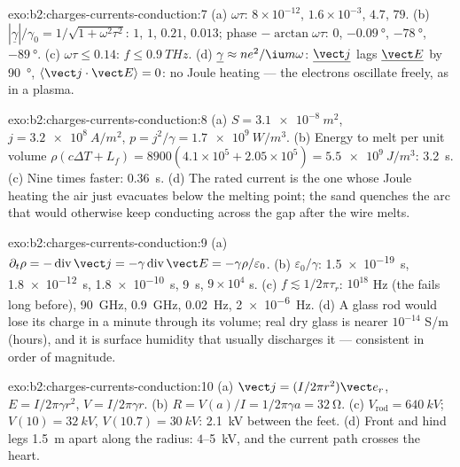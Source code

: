 \begin{solution}{exo:b2:charges-currents-conduction:7}
(a) $\omega\tau$: $8 \times 10^{-12}$, $1.6 \times 10^{-3}$, $4.7$, $79$. (b) $|\underline\gamma|/\gamma_0 =
1/\sqrt{1 + \omega^2\tau^2}$: $1$, $1$, $0.21$, $0.013$; phase $-\arctan\omega\tau$: $0$,
$-\qty{0.09}{\degree}$, $-\qty{78}{\degree}$, $-\qty{89}{\degree}$. (c) $\omega\tau \le 0.14$: $f \le
\qty{0.9}{THz}$. (d) $\underline\gamma \approx ne^2/\iu m\omega$: $\underline{\vect j}$ lags
$\underline{\vect E}$ by \qty{90}{\degree}, $\langle\vect j\cdot\vect E\rangle = 0$: no Joule
heating --- the electrons oscillate freely, as in a plasma.
\end{solution}

\begin{solution}{exo:b2:charges-currents-conduction:8}
(a) $S = \qty{3.1e-8}{m^2}$, $j = \qty{3.2e8}{A/m^2}$, $p = j^2/\gamma = \qty{1.7e9}{W/m^3}$.
(b) Energy to melt per unit volume $\rho(c\Delta T + L_f) = 8900(4.1 \times 10^5 + 2.05 \times
10^5) = \qty{5.5e9}{J/m^3}$: \qty{3.2}{s}. (c) Nine times faster: \qty{0.36}{s}. (d) The
rated current is the one whose Joule heating the air just evacuates
below the melting point; the sand quenches the arc that would
otherwise keep conducting across the gap after the wire melts.
\end{solution}

\begin{solution}{exo:b2:charges-currents-conduction:9}
(a) $\partial_t\rho = -\operatorname{div}\vect j = -\gamma\operatorname{div}\vect E = -\gamma\rho/
\varepsilon_0$. (b) $\varepsilon_0/\gamma$: \qty{1.5e-19}{s}, \qty{1.8e-12}{s}, \qty{1.8e-10}{s},
\qty{9}{s}, $9 \times 10^4$ s. (c) $f \lesssim 1/2\pi\tau_r$: $10^{18}$ Hz (the 
fails long before), \qty{90}{GHz}, \qty{0.9}{GHz}, \qty{0.02}{Hz}, \qty{2e-6}{Hz}. (d)
A glass rod would lose its charge in a minute through its volume;
real dry glass is nearer $10^{-14}$ S/m (hours), and it is surface
humidity that usually discharges it --- consistent in order of
magnitude.
\end{solution}

\begin{solution}{exo:b2:charges-currents-conduction:10}
(a) $\vect j = (I/2\pi r^2)\vect e_r$, $E = I/2\pi\gamma r^2$, $V = I/2\pi\gamma r$. (b) $R = V(a)
/I = 1/2\pi\gamma a = \qty{32}{\ohm}$. (c) $V_{\text{rod}} = \qty{640}{kV}$; $V(10) = \qty{32}{kV}$,
$V(10.7) = \qty{30}{kV}$: \qty{2.1}{kV} between the feet. (d) Front and hind
legs \qty{1.5}{m} apart along the radius: $4$--\qty{5}{kV}, and the current
path crosses the heart.
\end{solution}

